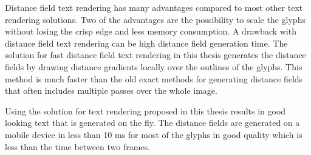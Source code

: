 Distance field text rendering has many advantages compared to most other text rendering solutions. Two of the advantages are the possibility to scale the glyphs without losing the crisp edge and less memory consumption. A drawback with distance field text rendering can be high distance field generation time. The solution for fast distance field text rendering in this thesis generates the distance fields by drawing distance gradients locally over the outlines of the glyphs. This method is much faster than the old exact methods for generating distance fields that often includes multiple passes over the whole image.

Using the solution for text rendering proposed in this thesis results in good looking text that is generated on the fly. The distance fields are generated on a mobile device in less than 10 ms for most of the glyphs in good quality which is less than the time between two frames.
